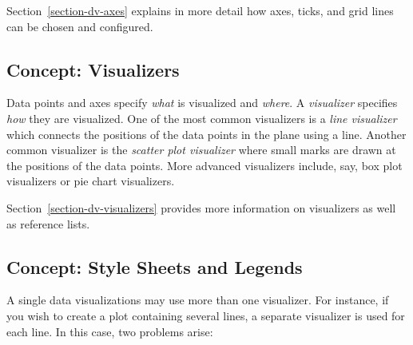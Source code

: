 Section~\ref{section-dv-axes} explains in more detail how axes, ticks,
and grid lines can be chosen and configured.


\subsection{Concept: Visualizers}

Data points and axes specify \emph{what} is visualized and
\emph{where}. A \emph{visualizer} specifies \emph{how} they are
visualized. One of the most common visualizers is a \emph{line
  visualizer} which connects the positions of the data points in the
plane using a line. Another common visualizer is the \emph{scatter
  plot visualizer} where small marks are drawn at the positions of the
data points. More advanced visualizers include, say, box plot
visualizers or pie chart visualizers.

    \begin{codeexample}[]
    \end{codeexample}
    \begin{codeexample}[]
    \end{codeexample}
    
Section~\ref{section-dv-visualizers} provides more information on
visualizers as well as reference lists.


\subsection{Concept: Style Sheets and Legends}
    
A single data visualizations may use more than one visualizer. For
instance, if you wish to create a plot containing several lines, a
separate visualizer is used for each line. In this case, two problems
arise:

